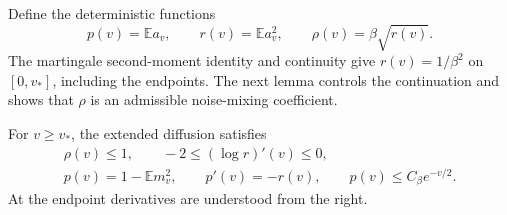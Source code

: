 Define the deterministic functions
\[
 p(v)=\mathbb E a_v,\qquad r(v)=\mathbb E a_v^2,
 \qquad \rho(v)=\beta\sqrt{r(v)}.
\]
The martingale second-moment identity and continuity give
$r(v)=1/\beta^2$ on $[0,v_*]$, including the endpoints.
The next lemma controls the continuation and shows that $\rho$ is
an admissible noise-mixing coefficient.

\begin{lemma}\label{lem:scalar-tail}
For $v\ge v_*$, the extended diffusion satisfies
\[
 \begin{gathered}
 \rho(v)\le1,\qquad -2\le(\log r)'(v)\le0,\\
 p(v)=1-\mathbb E m_v^2,\qquad p'(v)=-r(v),
 \qquad p(v)\le C_\beta e^{-v/2}.
 \end{gathered}
 \tag{1}\label{eq:1}
\]
At the endpoint derivatives are understood from the right.
\end{lemma}


